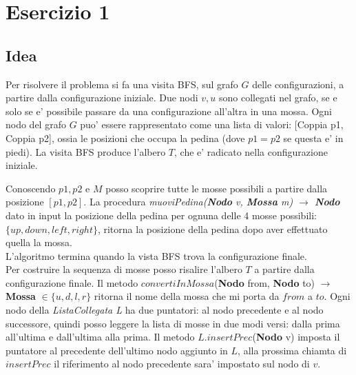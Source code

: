 \section*{Esercizio 1}

\subsection{Idea}
Per risolvere il problema si fa una visita BFS, sul grafo $G$ delle configurazioni, a partire dalla configurazione iniziale.
Due nodi $v,u$ sono collegati nel grafo, se e solo se e' possibile passare da una configurazione all'altra in una mossa.
Ogni nodo del grafo $G$ puo' essere rappresentato come una lista di valori: [Coppia p1, Coppia p2],
ossia le posizioni che occupa la pedina (dove $p1=p2$ se questa e' in piedi). 
La visita BFS produce l'albero $T$, che e' radicato nella configurazione iniziale.

Conoscendo $p1,p2$ e $M$ posso scoprire tutte le mosse possibili a partire dalla posizione $[p1,p2]$.
La procedura \emph{muoviPedina(\textbf{Nodo} v, \textbf{Mossa} m) $\to$ \textbf{Nodo}} dato in input la posizione della pedina
per ognuna delle 4 mosse possibili: $\{up,down,left,right\}$, ritorna la posizione della pedina dopo aver effettuato 
quella la mossa. \\

L'algoritmo termina quando la vista BFS trova la configurazione finale.\\

Per costruire la sequenza di mosse posso risalire l'albero $T$ a partire dalla configurazione finale. Il metodo
$convertiInMossa$(\textbf{Nodo} from, \textbf{Nodo} to) $\to$ \textbf{Mossa} $\in \{u,d,l,r\}$ ritorna il nome 
della mossa che mi porta da $from$ a $to$.
Ogni nodo della \emph{ListaCollegata L} ha due puntatori: al nodo precedente e al nodo successore, quindi posso
leggere la lista di mosse in due modi versi: dalla prima all'ultima e dall'ultima alla prima.
Il metodo $L.insertPrec$(\textbf{Nodo} v) imposta il puntatore al precedente dell'ultimo nodo aggiunto in $L$,
alla prossima chiamta di $insertPrec$ il riferimento al nodo precedente sara' impostato sul nodo di $v$.


